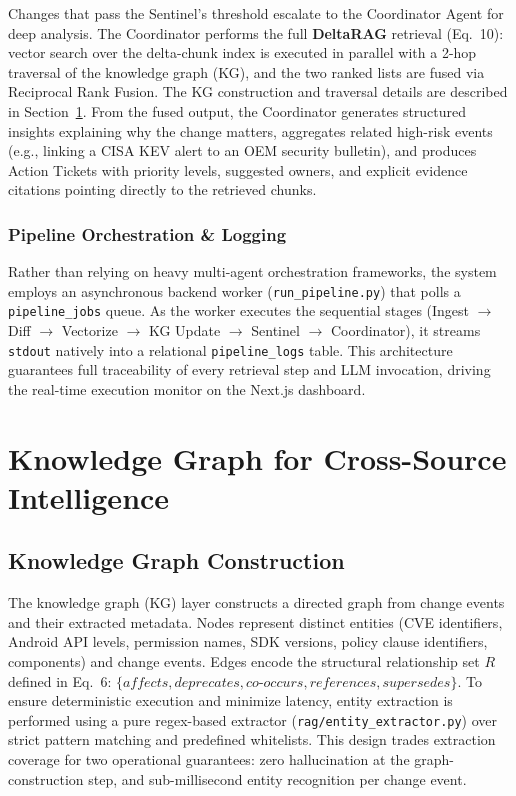 \documentclass[
]{article}
\begin{document}
Changes that pass the Sentinel's threshold escalate to the Coordinator
Agent for deep analysis. The Coordinator performs the full
\textbf{DeltaRAG} retrieval (Eq.~10): vector search over the
delta-chunk index is executed in parallel with a 2-hop traversal of
the knowledge graph (KG), and the two ranked lists are fused via
Reciprocal Rank Fusion. The KG construction and traversal details are
described in Section~\ref{graph-rag-for-cross-source-intelligence}.
From the fused output, the Coordinator generates structured insights
explaining why the change matters, aggregates related high-risk events
(e.g., linking a CISA KEV alert to an OEM security bulletin), and
produces Action Tickets with priority levels, suggested owners, and
explicit evidence citations pointing directly to the retrieved chunks.

\subsubsection{Pipeline Orchestration \& Logging}

Rather than relying on heavy multi-agent orchestration frameworks, the system employs an asynchronous backend worker (\texttt{run\_pipeline.py}) that polls a \texttt{pipeline\_jobs} queue. As the worker executes the sequential stages (Ingest $\rightarrow$ Diff $\rightarrow$ Vectorize $\rightarrow$ KG Update $\rightarrow$ Sentinel $\rightarrow$ Coordinator), it streams \texttt{stdout} natively into a relational \texttt{pipeline\_logs} table. This architecture guarantees full traceability of every retrieval step and LLM invocation, driving the real-time execution monitor on the Next.js dashboard.


\section{Knowledge Graph for Cross-Source Intelligence}\label{graph-rag-for-cross-source-intelligence}

\subsection{Knowledge Graph Construction}\label{knowledge-graph-construction}

The knowledge graph (KG) layer constructs a directed graph from change
events and their extracted metadata. Nodes represent distinct entities
(CVE identifiers, Android API levels, permission names, SDK versions,
policy clause identifiers, components) and change events. Edges encode
the structural relationship set $R$ defined in Eq.~6: $\{\textit{affects},
\textit{deprecates}, \textit{co-occurs}, \textit{references},
\textit{supersedes}\}$. To ensure deterministic execution and minimize
latency, entity extraction is performed using a pure regex-based
extractor (\texttt{rag/entity\_extractor.py}) over strict pattern
matching and predefined whitelists. This design trades extraction
coverage for two operational guarantees: zero hallucination at the
graph-construction step, and sub-millisecond entity recognition per
change event.
\end{document}
